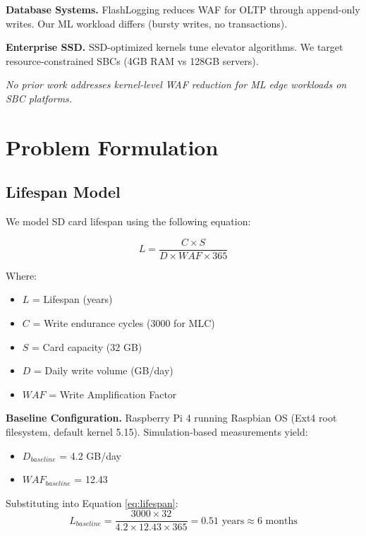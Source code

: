 \documentclass[conference]{IEEEtran}
\begin{document}
\textbf{Database Systems.} FlashLogging \cite{b3} reduces WAF for OLTP through append-only writes. Our ML workload differs (bursty writes, no transactions).

\textbf{Enterprise SSD.} SSD-optimized kernels \cite{b2} tune elevator algorithms. We target resource-constrained SBCs (4GB RAM vs 128GB servers).

\textit{No prior work addresses kernel-level WAF reduction for ML edge workloads on SBC platforms.}

\section{Problem Formulation}

\subsection{Lifespan Model}

We model SD card lifespan using the following equation:

\begin{equation}
L = \frac{C \times S}{D \times WAF \times 365}
\label{eq:lifespan}
\end{equation}

Where:
\begin{itemize}
    \item $L$ = Lifespan (years)
    \item $C$ = Write endurance cycles (3000 for MLC)
    \item $S$ = Card capacity (32 GB)
    \item $D$ = Daily write volume (GB/day)
    \item $WAF$ = Write Amplification Factor
\end{itemize}

\textbf{Baseline Configuration.} Raspberry Pi 4 running Raspbian OS (Ext4 root filesystem, default kernel 5.15). Simulation-based measurements yield:
\begin{itemize}
    \item $D_{baseline}$ = 4.2 GB/day
    \item $WAF_{baseline}$ = 12.43
\end{itemize}

Substituting into Equation \ref{eq:lifespan}:
\begin{equation}
L_{baseline} = \frac{3000 \times 32}{4.2 \times 12.43 \times 365} = 0.51 \text{ years} \approx 6 \text{ months}
\end{equation}
\end{document}
